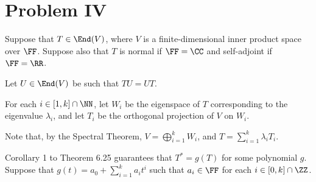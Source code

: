 \documentclass[11pt]{scrartcl}
\begin{document}
\section{Problem IV}

Suppose that $T \in \End(V)$, where $V$ is a finite-dimensional inner
product space over $\FF$. Suppose also that $T$ is normal if
$\FF = \CC$ and self-adjoint if $\FF = \RR$.

Let $U \in \End(V)$ be such that $TU = UT$.


For each $i\in [1, k]\cap \NN$, let $W_i$ be the eigenspace of $T$
corresponding to the eigenvalue $\lambda_i$, and let $T_i$ be the
orthogonal projection of $V$ on $W_i$.

Note that, by the Spectral Theorem, $V = \bigoplus_{i=1}^k W_i$, and
$T = \sum_{i=1}^k\lambda_iT_i$.

Corollary 1 to Theorem 6.25 guarantees that $T^{*} = g(T)$ for some
polynomial $g$. Suppose that $g(t) = a_0+\sum_{i=1}^ka_it^i$ such that
$a_i\in \FF$ for each $i\in[0, k]\cap \ZZ$.







\end{document}
